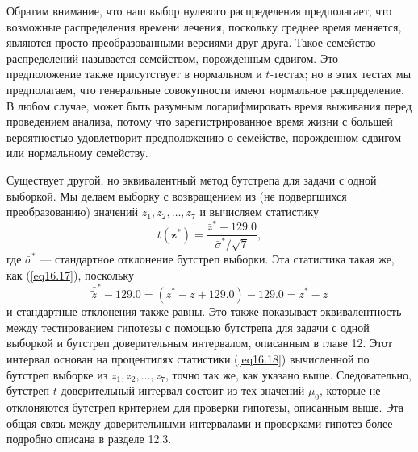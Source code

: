 Обратим внимание, что наш выбор нулевого распределения предполагает, что возможные распределения времени лечения, поскольку среднее время меняется, являются просто преобразованными версиями друг друга. Такое семейство распределений называется семейством, порожденным сдвигом. Это предположение также присутствует в нормальном и $t$-тестах; но в этих тестах мы предполагаем, что генеральные совокупности имеют нормальное распределение. В любом случае, может быть разумным логарифмировать время выживания перед проведением анализа, потому что зарегистрированное время жизни с большей вероятностью удовлетворит предположению о семействе, порожденном сдвигом или нормальному семейству.

Существует другой, но эквивалентный метод бутстрепа для задачи с одной выборкой. Мы делаем выборку с возвращением из (не подвергшихся преобразованию) значений $z_1, z_2, \ldots, z_7$ и вычисляем статистику
\begin{equation}\label{eq16.18}
    t(\mathbf{z}^{*}) = \frac{\bar{z}^{*}-129.0}{\bar{\sigma}^{*}/\sqrt{7}},
\end{equation}
где $\bar{\sigma}^{*}$ --- стандартное отклонение бутстреп выборки. Эта статистика такая же, как (\ref{eq16.17}), поскольку
\begin{equation*}
    \bar{\widetilde{z}}^{*} - 129.0 = (\bar{z}^{*} - \bar{z} + 129.0) - 129.0 = \bar{z}^{*} - \bar{z} 
\end{equation*}
и стандартные отклонения также равны. Это также показывает эквивалентность между тестированием гипотезы с помощью бутстрепа для задачи с одной выборкой и бутстреп доверительным интервалом, описанным в главе 12. Этот интервал основан на процентилях статистики (\ref{eq16.18}) вычисленной по  бутстреп выборке из $z_1, z_2, \ldots, z_7$, точно так же, как указано выше. Следовательно, бутстреп-$t$ доверительный интервал состоит из тех значений $\mu_0$, которые не отклоняются бутстреп критерием для проверки гипотезы, описанным выше. Эта общая связь между доверительными интервалами и проверками гипотез более подробно описана в разделе 12.3.

